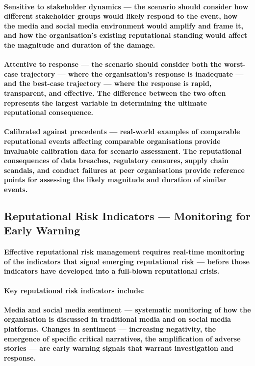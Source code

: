 \paragraph{\textbf{Sensitive to stakeholder dynamics} — the scenario should consider how different stakeholder groups would likely respond to the event, how the media and social media environment would amplify and frame it, and how the organisation's existing reputational standing would affect the magnitude and duration of the damage.}
\paragraph{\textbf{Attentive to response} — the scenario should consider both the worst-case trajectory — where the organisation's response is inadequate — and the best-case trajectory — where the response is rapid, transparent, and effective. The difference between the two often represents the largest variable in determining the ultimate reputational consequence.}
\paragraph{\textbf{Calibrated against precedents} — real-world examples of comparable reputational events affecting comparable organisations provide invaluable calibration data for scenario assessment. The reputational consequences of data breaches, regulatory censures, supply chain scandals, and conduct failures at peer organisations provide reference points for assessing the likely magnitude and duration of similar events.}

\subsection{Reputational Risk Indicators — Monitoring for Early Warning}
\paragraph{Effective reputational risk management requires real-time monitoring of the indicators that signal emerging reputational risk — before those indicators have developed into a full-blown reputational crisis.}
\paragraph{Key reputational risk indicators include:}
\paragraph{\textbf{Media and social media sentiment} — systematic monitoring of how the organisation is discussed in traditional media and on social media platforms. Changes in sentiment — increasing negativity, the emergence of specific critical narratives, the amplification of adverse stories — are early warning signals that warrant investigation and response.}
